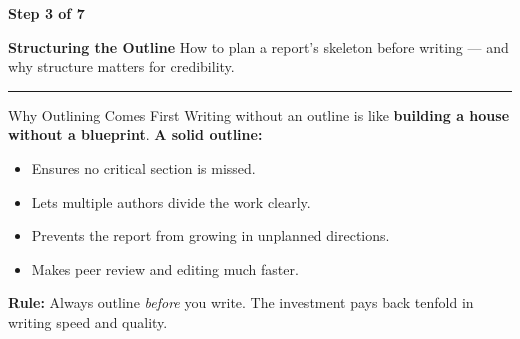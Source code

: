\documentclass[xcolor={table,dvipsnames},aspectratio=169,11pt]{beamer}
\newcommand{\stepbadge}[1]{%
    \begin{tcolorbox}[colback=nsoGold,colframe=nsoGold,arc=8pt,auto outer arc,
        halign=center,valign=center,width=2.5cm,boxrule=0pt,top=2pt,bottom=2pt,left=2pt,right=2pt]
        \color{white}\tiny\bfseries #1
    \end{tcolorbox}%
}
\begin{document}
{
\begin{frame}[plain]
    \vspace{1.5cm}
    \stepbadge{Step 3 of 7}
    \vskip 0.4cm
    {\color{white}\LARGE\bfseries Structuring the Outline}
    \vskip 0.4cm
    {\color{nsoLight}\large How to plan a report's skeleton before writing --- and why structure matters for credibility.}
    \vskip 0.8cm
    \textcolor{nsoGold}{\rule{3cm}{3pt}}
\end{frame}
}

\begin{frame}{Why Outlining Comes First}
    Writing without an outline is like \textbf{building a house without a blueprint}.
    \vskip 0.2cm
    \textbf{A solid outline:}
    \begin{itemize}
        \item Ensures no critical section is missed.
        \item Lets multiple authors divide the work clearly.
        \item Prevents the report from growing in unplanned directions.
        \item Makes peer review and editing much faster.
    \end{itemize}
    \vskip 0.2cm
    \begin{blockquote}
    \footnotesize \textbf{Rule:} Always outline \emph{before} you write. The investment pays back tenfold in writing speed and quality.
    \end{blockquote}
\end{frame}
\end{document}
